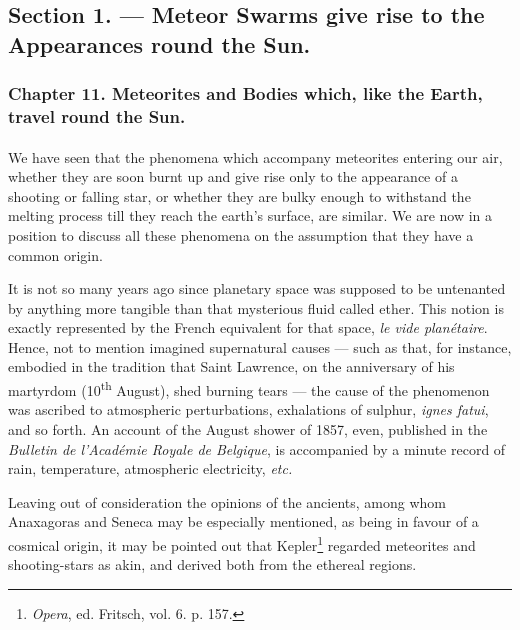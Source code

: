 \documentclass[a4paper, 12pt, oneside, polutonikogreek, english]{article}
\begin{document}
\subsection{Section 1. --- Meteor Swarms give rise to the Appearances round the Sun.}
\subsubsection{Chapter 11. Meteorites and Bodies which, like the Earth, travel round the Sun.}
\paragraph{}
We have seen that the phenomena which accompany meteorites entering our air, whether they are soon burnt up and give rise only to the appearance of a shooting or falling star, or whether they are bulky enough to withstand the melting process till they reach the earth's surface, are similar. We are now in a position to discuss all these phenomena on the assumption that they have a common origin.

It is not so many years ago since planetary space was supposed to be untenanted by anything more tangible than that mysterious fluid called ether. This notion is exactly represented by the French equivalent for that space, \emph{le vide planétaire}. Hence, not to mention imagined supernatural causes --- such as that, for instance, embodied in the tradition that Saint Lawrence, on the anniversary of his martyrdom (10\textsuperscript{th} August), shed burning tears --- the cause of the phenomenon was ascribed to atmospheric perturbations, exhalations of sulphur, \emph{ignes fatui}, and so forth. An account of the August shower of 1857, even, published in the \emph{Bulletin de l'Académie Royale de Belgique}, is accompanied by a minute record of rain, temperature, atmospheric electricity, \emph{etc.}

Leaving out of consideration the opinions of the ancients, among whom Anaxagoras and Seneca may be especially mentioned, as being in favour of a cosmical origin, it may be pointed out that Kepler\footnote{\emph{Opera}, ed. Fritsch, vol. 6. p. 157.} regarded meteorites and shooting-stars as akin, and derived both from the ethereal regions.
\end{document}
